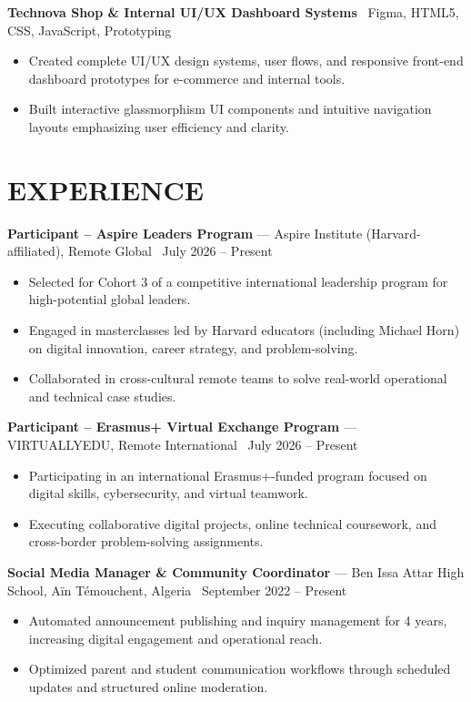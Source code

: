 \documentclass[10.5pt, letterpaper]{article}
\newcommand{\entry}[4]{%
  \noindent\textbf{#1} --- #3, #4 \textbar\ #2\par
  \vspace{2pt}
}
\newcommand{\projectentry}[2]{%
  \noindent\textbf{#1} \textbar\ #2\par
  \vspace{2pt}
}
\newcommand{\resumeItem}[1]{\item #1}
\begin{document}
\projectentry{Technova Shop \& Internal UI/UX Dashboard Systems}{Figma, HTML5, CSS, JavaScript, Prototyping}
\begin{itemize}
  \resumeItem{Created complete UI/UX design systems, user flows, and responsive front-end dashboard prototypes for e-commerce and internal tools.}
  \resumeItem{Built interactive glassmorphism UI components and intuitive navigation layouts emphasizing user efficiency and clarity.}
\end{itemize}

\section{EXPERIENCE}

\entry{Participant -- Aspire Leaders Program}{July 2026 -- Present}{Aspire Institute (Harvard-affiliated)}{Remote Global}
\begin{itemize}
  \resumeItem{Selected for Cohort 3 of a competitive international leadership program for high-potential global leaders.}
  \resumeItem{Engaged in masterclasses led by Harvard educators (including Michael Horn) on digital innovation, career strategy, and problem-solving.}
  \resumeItem{Collaborated in cross-cultural remote teams to solve real-world operational and technical case studies.}
\end{itemize}

\entry{Participant -- Erasmus+ Virtual Exchange Program}{July 2026 -- Present}{VIRTUALLYEDU}{Remote International}
\begin{itemize}
  \resumeItem{Participating in an international Erasmus+-funded program focused on digital skills, cybersecurity, and virtual teamwork.}
  \resumeItem{Executing collaborative digital projects, online technical coursework, and cross-border problem-solving assignments.}
\end{itemize}

\entry{Social Media Manager \& Community Coordinator}{September 2022 -- Present}{Ben Issa Attar High School}{Aïn Témouchent, Algeria}
\begin{itemize}
  \resumeItem{Automated announcement publishing and inquiry management for 4 years, increasing digital engagement and operational reach.}
  \resumeItem{Optimized parent and student communication workflows through scheduled updates and structured online moderation.}
\end{itemize}
\end{document}
